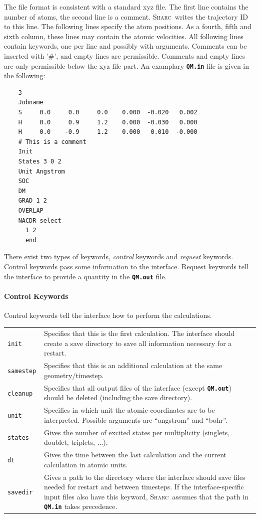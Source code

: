 \documentclass[a4paper,11pt,DIV=15,openany,twoside=false]{scrbook}
\newcommand{\sharc}{\textsc{Sharc}}
\newcommand{\ttt}[1]{\textbf{\texttt{#1}}}
\newenvironment{example}{
  \vspace{0mm}
  \definecolor{shadecolor}{HTML}{BBDDFF}
  \begin{shaded}
  \begin{minipage}{0.9\textwidth}
}{
  \end{minipage}
  \end{shaded}
}
\begin{document}
The file format is consistent with a standard xyz file. The first line contains the number of atoms, the second line is a comment. \sharc\ writes the trajectory ID to this line. The following lines specify the atom positions. As a fourth, fifth and sixth column, these lines may contain the atomic velocities.
All following lines contain keywords, one per line and possibly with arguments. Comments can be inserted with '\#', and empty lines are permissible. Comments and empty lines are only permissible below the xyz file part.
An examplary \ttt{QM.in} file is given in the following:
\begin{example}
  \begin{verbatim}
    3
    Jobname
    S     0.0     0.0     0.0    0.000  -0.020   0.002
    H     0.0     0.9     1.2    0.000  -0.030   0.000
    H     0.0    -0.9     1.2    0.000   0.010  -0.000
    # This is a comment
    Init
    States 3 0 2
    Unit Angstrom
    SOC
    DM
    GRAD 1 2
    OVERLAP
    NACDR select
      1 2
      end
  \end{verbatim}
\end{example}

There exist two types of keywords, \textit{control} keywords and \textit{request} keywords. Control keywords pass some information to the interface. Request keywords tell the interface to provide a quantity in the \ttt{QM.out} file.

\paragraph{Control Keywords}

Control keywords tell the interface how to perform the calculations.

\begin{tabular}{>{\tt}lp{9cm}}
init            &Specifies that this is the first calculation. The interface should create a save directory to save all information necessary for a restart. \\
samestep        &Specifies that this is an additional calculation at the same geometry/timestep. \\
cleanup         &Specifies that all output files of the interface (except \ttt{QM.out}) should be deleted (including the save directory).\\
unit            &Specifies in which unit the atomic coordinates are to be interpreted. Possible arguments are ``angstrom'' and ``bohr''.\\
states          &Gives the number of excited states per multiplicity (singlets, doublet, triplets, ...).\\
dt              &Gives the time between the last calculation and the current calculation in atomic units.\\
savedir         &Gives a path to the directory where the interface should save files needed for restart and between timesteps. If the interface-specific input files also have this keyword, \sharc\ assumes that the path in \ttt{QM.in} takes precedence.\\
\end{tabular}
\end{document}
